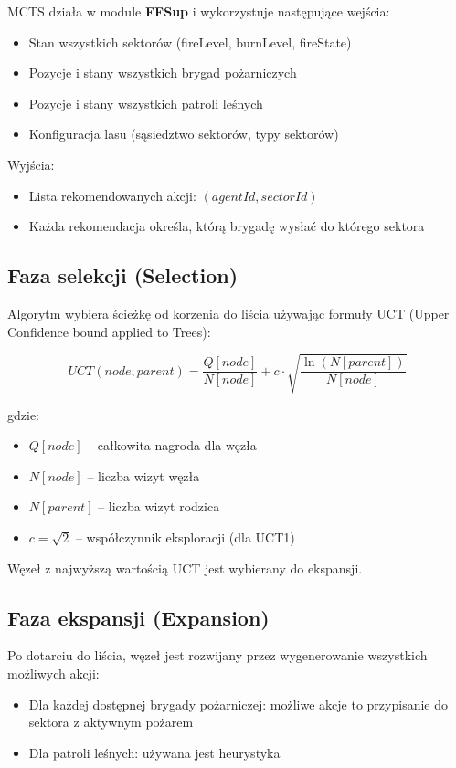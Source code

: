 \documentclass[11pt,a4paper]{article}
\begin{document}
MCTS działa w module \textbf{FFSup} i wykorzystuje następujące wejścia:
\begin{itemize}
    \item Stan wszystkich sektorów (fireLevel, burnLevel, fireState)
    \item Pozycje i stany wszystkich brygad pożarniczych
    \item Pozycje i stany wszystkich patroli leśnych
    \item Konfiguracja lasu (sąsiedztwo sektorów, typy sektorów)
\end{itemize}

Wyjścia:
\begin{itemize}
    \item Lista rekomendowanych akcji: $(agentId, sectorId)$
    \item Każda rekomendacja określa, którą brygadę wysłać do którego sektora
\end{itemize}

\subsection{Faza selekcji (Selection)}

Algorytm wybiera ścieżkę od korzenia do liścia używając formuły UCT (Upper Confidence bound applied to Trees):

\begin{equation}
UCT(node, parent) = \frac{Q[node]}{N[node]} + c \cdot \sqrt{\frac{\ln(N[parent])}{N[node]}}
\end{equation}

gdzie:
\begin{itemize}
    \item $Q[node]$ -- całkowita nagroda dla węzła
    \item $N[node]$ -- liczba wizyt węzła
    \item $N[parent]$ -- liczba wizyt rodzica
    \item $c = \sqrt{2}$ -- współczynnik eksploracji (dla UCT1)
\end{itemize}

Węzeł z najwyższą wartością UCT jest wybierany do ekspansji.

\subsection{Faza ekspansji (Expansion)}

Po dotarciu do liścia, węzeł jest rozwijany przez wygenerowanie wszystkich możliwych akcji:
\begin{itemize}
    \item Dla każdej dostępnej brygady pożarniczej: możliwe akcje to przypisanie do sektora z aktywnym pożarem
    \item Dla patroli leśnych: używana jest heurystyka
\end{itemize}
\end{document}
